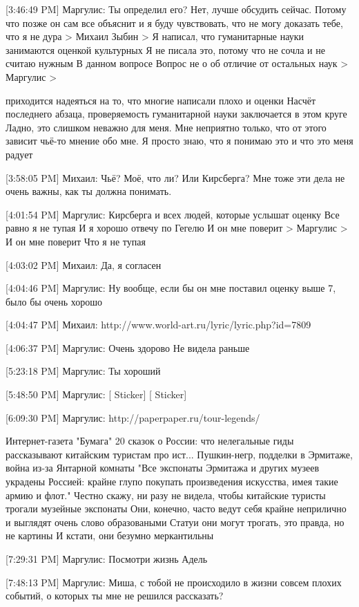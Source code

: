 \documentclass{article}
\begin{document}
[3:46:49 PM] Маргулис:
Ты определил его?
 Нет, лучше обсудить сейчас. Потому что позже он сам все объяснит и я буду чувствовать, что не могу доказать тебе, что я не дура
> Михаил Зыбин
> Я написал, что гуманитарные науки занимаются оценкой культурных
Я не писала это, потому что не сочла и не считаю нужным
 В данном вопросе
 Вопрос не о об отличие от остальных наук
> Маргулис
> {приходится надеяться на то, что многие написали плохо и оценки
Насчёт последнего абзаца, проверяемость гуманитарной науки заключается в этом круге
 Ладно, это слишком неважно для меня. Мне неприятно только, что от этого зависит чьё-то мнение обо мне. Я просто знаю, что я понимаю это и что это меня радует

[3:58:05 PM] Михаил:
Чьё? Моё, что ли? Или Кирсберга?
 Мне тоже эти дела не очень важны, как ты должна понимать.

[4:01:54 PM] Маргулис:
Кирсберга и всех людей, которые услышат оценку
 Все равно я не тупая
 И я хорошо отвечу по Гегелю
 И он мне поверит
> Маргулис
> И он мне поверит
Что я не тупая

[4:03:02 PM] Михаил:
Да, я согласен

[4:04:46 PM] Маргулис:
Ну вообще, если бы он мне поставил оценку выше 7, было бы очень хорошо

[4:04:47 PM] Михаил:
http://www.world-art.ru/lyric/lyric.php?id=7809

[4:06:37 PM] Маргулис:
Очень здорово
 Не видела раньше

[5:23:18 PM] Маргулис:
Ты хороший

[5:48:50 PM] Маргулис:
[ Sticker]
 [ Sticker]

[6:09:30 PM] Маргулис:
http://paperpaper.ru/tour-legends/

Интернет-газета "Бумага"
20 сказок о России: что нелегальные гиды рассказывают китайским туристам про ист...
Пушкин-негр, подделки в Эрмитаже, война из-за Янтарной комнаты
 "Все экспонаты Эрмитажа и других музеев украдены Россией: крайне глупо покупать произведения искусства, имея такие армию и флот."
 Честно скажу, ни разу не видела, чтобы китайские туристы трогали музейные экспонаты
 Они, конечно, часто ведут себя крайне неприлично и выглядят очень слово образоваными
 Статуи они могут трогать, это правда, но не картины
 И кстати, они безумно меркантильны

[7:29:31 PM] Маргулис:
Посмотри жизнь Адель

[7:48:13 PM] Маргулис:
Миша, с тобой не происходило в жизни совсем плохих событий, о которых ты мне не решился рассказать?

}
\end{document}
